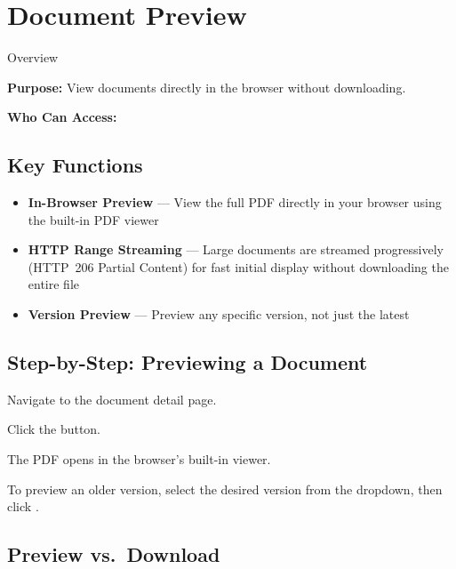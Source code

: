 \section{Document Preview}

\begin{ugModule}{Overview}

  \textbf{Purpose:}
  View documents directly in the browser without downloading.

  \textbf{Who Can Access:}
     
\end{ugModule}

\subsection{Key Functions}
\begin{itemize}[leftmargin=18pt]
  \item \textbf{In-Browser Preview} --- View the full PDF
    directly in your browser using the built-in PDF viewer
  \item \textbf{HTTP Range Streaming} --- Large documents are
    streamed progressively (HTTP~206 Partial Content) for
    fast initial display without downloading the entire file
  \item \textbf{Version Preview} --- Preview any specific
    version, not just the latest
\end{itemize}

\subsection{Step-by-Step: Previewing a Document}
\begin{ugSteps}
  \item Navigate to the document detail page.
  \item Click the  button.
  \item The PDF opens in the browser's built-in viewer.
  \item To preview an older version, select the desired version
        from the  dropdown, then click
        .
\end{ugSteps}

\subsection{Preview vs.\ Download}

